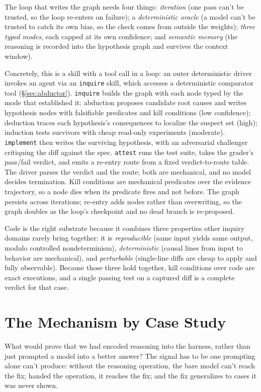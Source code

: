 \documentclass[sigconf,review,anonymous]{acmart}
\begin{document}
The loop that writes the graph needs four things: \emph{iteration} (one pass can't be trusted, so the loop re-enters on failure); a \emph{deterministic oracle} (a model can't be trusted to catch its own bias, so the check comes from outside the weights); \emph{three typed modes}, each capped at its own confidence; and \emph{semantic memory} (the reasoning is recorded into the hypothesis graph and survives the context window).

Concretely, this is a skill with a tool call in a loop: an outer deterministic driver invokes an agent via an \texttt{inquire} skill, which accesses a deterministic comparator tool (\S\ref{sec:abductor}). \texttt{inquire} builds the graph with each node typed by the mode that established it: abduction proposes candidate root causes and writes hypothesis nodes with falsifiable predicates and kill conditions (low confidence); deduction traces each hypothesis's consequences to localize the suspect set (high); induction tests survivors with cheap read-only experiments (moderate). \texttt{implement} then writes the surviving hypothesis, with an adversarial challenger critiquing the diff against the spec. \texttt{attest} runs the test suite, takes the grader's pass/fail verdict, and emits a re-entry route from a fixed verdict-to-route table. The driver parses the verdict and the route; both are mechanical, and no model decides termination. Kill conditions are mechanical predicates over the evidence trajectory, so a node dies when its predicate fires and not before. The graph persists across iterations; re-entry adds nodes rather than overwriting, so the graph doubles as the loop's checkpoint and no dead branch is re-proposed.

Code is the right substrate because it combines three properties other inquiry domains rarely bring together: it is \emph{reproducible} (same input yields same output, modulo controlled nondeterminism), \emph{deterministic} (causal lines from input to behavior are mechanical), and \emph{perturbable} (single-line diffs are cheap to apply and fully observable). Because those three hold together, kill conditions over code are exact executions, and a single passing test on a captured diff is a complete verdict for that case.

\section{The Mechanism by Case Study}\label{sec:case}

What would prove that we had encoded reasoning into the harness, rather than just prompted a model into a better answer? The signal has to be one prompting alone can't produce: without the reasoning operation, the bare model can't reach the fix; handed the operation, it reaches the fix; and the fix generalizes to cases it was never shown.
\end{document}
